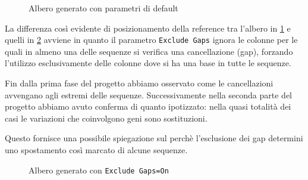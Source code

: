 \documentclass[11pt,italian]{article}
\begin{document}
\begin{figure}[H]
  \caption{Albero generato con parametri di default}
  \label{fig:tool-tree}
\end{figure}
\noindent
La differenza così evidente di posizionamento della reference tra l'albero in \cref{fig:tool-tree} e quelli in \cref{fig:tool-tree-skip} avviene in quanto il parametro \lstinline{Exclude Gaps} ignora le colonne per le quali in almeno una delle sequenze si verifica una cancellazione (gap), forzando l'utilizzo esclusivamente delle colonne dove si ha una base in tutte le sequenze.

Fin dalla prima fase del progetto abbiamo osservato come le cancellazioni avvengano agli estremi delle sequenze. Successivamente nella seconda parte del progetto abbiamo avuto conferma di quanto ipotizzato: nella quasi totalità dei casi le variazioni che coinvolgono geni sono sostituzioni.

Questo fornisce una possibile spiegazione sul perchè l'esclusione dei gap determini uno spostamento così marcato di alcune sequenze.

\begin{figure}[]
  \caption{Albero generato con \lstinline{Exclude Gaps=On}}
  \label{fig:tool-tree-skip}
\end{figure}
\end{document}
